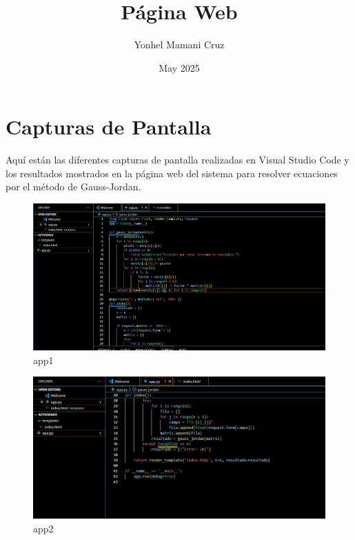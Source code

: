 \documentclass{article}
\title{Página Web}
\author{Yonhel Mamani Cruz}
\date{May 2025}
\begin{document}
\maketitle

\section{Capturas de Pantalla}

Aquí están las diferentes capturas de pantalla realizadas en Visual Studio Code y los resultados mostrados en la página web del sistema para resolver ecuaciones por el método de Gauss-Jordan.

\begin{figure}[h!]
    \centering
    \includegraphics[width=\textwidth]{images/app1.png}
    \caption{app1}
    \label{fig:app1}
\end{figure}

\begin{figure}[h!]
    \centering
    \includegraphics[width=\textwidth]{images/app2.png}
    \caption{app2}
    \label{fig:app2}
\end{figure}
\end{document}
